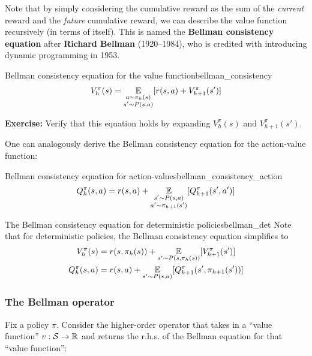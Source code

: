 \documentclass[\main/main]{subfiles}
\begin{document}
Note that by simply considering the cumulative reward as the sum of the \emph{current} reward and the \emph{future} cumulative reward, we can describe the value function recursively (in terms of itself). This is named the \textbf{Bellman consistency equation} after \textbf{Richard Bellman} (1920--1984), who is credited with introducing dynamic programming in 1953.

\begin{definition}{Bellman consistency equation for the value function}{bellman_consistency}
\begin{equation}
    V_h^\pi(s) = \operatorname*{\mathbb{E}}_{\substack{a \sim \pi_h(s) \\ s' \sim P(s, a)}} [r(s, a) + V_{h+1}^\pi(s')] \label{eq:bellman_consistency}
\end{equation}
\end{definition}


\textbf{Exercise:} Verify that this equation holds by expanding $V_h^\pi(s)$ and $V_{h+1}^\pi(s')$.

One can analogously derive the Bellman consistency equation for the action-value function:

\begin{definition}{Bellman consistency equation for action-values}{bellman_consistency_action}
\[
    Q_h^\pi(s, a) = r(s, a) + \operatorname*{\mathbb{E}}_{\substack{s' \sim P(s, a) \\ a' \sim \pi_{h+1}(s')}} [Q_{h+1}^\pi(s', a')]
\]
\end{definition}

\begin{remark}{The Bellman consistency equation for deterministic policies}{bellman_det}
    Note that for deterministic policies, the Bellman consistency equation simplifies to
    \begin{align*}
        V_h^\pi(s) &= r(s, \pi_h(s)) + \operatorname*{\mathbb{E}}_{s' \sim P(s, \pi_h(s))} [V_{h+1}^\pi(s')] \\
        Q_h^\pi(s, a) &= r(s, a) + \operatorname*{\mathbb{E}}_{s' \sim P(s, a)} [Q_{h+1}^\pi(s', \pi_{h+1}(s'))]
    \end{align*}
\end{remark}

\subsubsection{The Bellman operator}
\label{sec:bellman_operator}

Fix a policy $\pi$. Consider the higher-order operator that takes in a ``value function'' $v : \mathcal{S} \to \mathbb{R}$ and returns the r.h.s. of the Bellman equation for that ``value function'':
\end{document}
